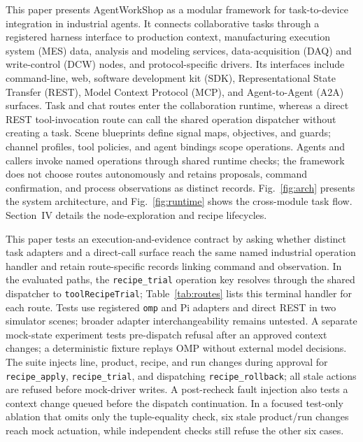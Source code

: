 This paper presents AgentWorkShop as a modular framework for task-to-device
integration in industrial agents. It connects collaborative tasks through a
registered harness interface to production context, manufacturing execution
system (MES) data, analysis and modeling services, data-acquisition (DAQ) and
write-control (DCW) nodes, and protocol-specific drivers. Its interfaces include
command-line, web, software development kit (SDK), Representational State
Transfer (REST), Model Context Protocol (MCP), and Agent-to-Agent
(A2A) surfaces. Task and chat routes enter the
collaboration runtime, whereas a direct REST tool-invocation route can call
the shared operation dispatcher without creating a task.
Scene blueprints define signal maps, objectives, and guards; channel profiles,
tool policies, and agent bindings scope operations. Agents and callers invoke
named operations through shared runtime checks; the framework does not choose
routes autonomously and retains proposals, command confirmation, and process
observations as distinct records. Fig.~\ref{fig:arch} presents the system
architecture, and Fig.~\ref{fig:runtime} shows the cross-module task flow.
Section~IV details the node-exploration and recipe lifecycles.

This paper tests an execution-and-evidence contract by asking whether distinct
task adapters and a direct-call surface reach the same named industrial
operation handler and retain route-specific records linking command and
observation.
In the evaluated paths, the \texttt{recipe\_trial} operation key resolves
through the shared dispatcher to \texttt{toolRecipeTrial}; Table~\ref{tab:routes}
lists this terminal handler for each route. Tests use registered
\texttt{omp} and Pi adapters and direct REST in two simulator scenes; broader
adapter interchangeability remains untested. A separate mock-state experiment
tests pre-dispatch refusal after an approved context changes; a deterministic
fixture replays OMP without external model decisions. The suite injects line,
product, recipe, and run changes during approval for \texttt{recipe\_apply},
\texttt{recipe\_trial}, and dispatching \texttt{recipe\_rollback}; all stale
actions are refused before mock-driver writes. A post-recheck fault injection
also tests a context change queued before the dispatch continuation. In a
focused test-only ablation that omits only the tuple-equality check, six
stale product/run changes reach mock actuation, while independent checks still
refuse the other six cases.

